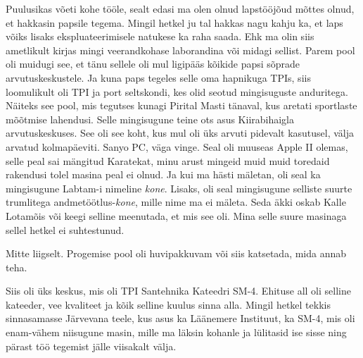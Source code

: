 Puulusikas võeti kohe tööle, sealt edasi ma olen olnud lapstööjõud mõttes olnud, et hakkasin papsile tegema. Mingil hetkel ju tal hakkas nagu kahju ka, et laps võiks  lisaks ekspluateerimisele natukese ka raha saada. Ehk ma olin siis ametlikult kirjas mingi veerandkohase laborandina või midagi sellist.  Parem pool oli muidugi see, et tänu sellele oli mul ligipääs kõikide papsi sõprade arvutuskeskustele. Ja kuna paps tegeles selle oma hapnikuga TPIs, siis loomulikult oli TPI ja port seltskondi, kes olid seotud mingisuguste anduritega. Näiteks see pool, mis tegutses kunagi Pirital Masti tänaval,  kus  aretati sportlaste mõõtmise lahendusi. Selle mingisugune teine ots asus Kiirabihaigla arvutuskeskuses. See oli see koht, kus mul oli üks arvuti pidevalt kasutusel, välja arvatud kolmapäeviti. Sanyo PC, väga vinge. Seal oli muuseas Apple II olemas, selle peal sai mängitud Karatekat, minu arust mingeid muid muid toredaid rakendusi tolel masina peal ei olnud. Ja kui ma hästi mäletan, oli seal ka mingisugune Labtam-i nimeline \emph{kone}. Lisaks, oli seal mingisugune selliste suurte trumlitega andmetöötlus-\emph{kone}, mille nime ma ei mäleta. Seda äkki oskab Kalle Lotamõis või keegi selline  meenutada, et mis see oli. Mina selle suure masinaga sellel hetkel ei suhtestunud. 


Mitte liigselt. Progemise pool oli  huvipakkuvam või siis katsetada, mida annab teha. 

Siis oli üks keskus, mis oli TPI Santehnika Kateedri SM-4. Ehituse all oli selline kateeder, vee kvaliteet ja kõik selline kuulus  sinna alla. Mingil hetkel tekkis sinnasamasse Järvevana teele, kus asus ka Läänemere Instituut, ka SM-4, mis oli  enam-vähem niisugune masin, mille ma läksin kohanle ja lülitasid ise sisse ning pärast töö tegemist jälle viisakalt välja. 

